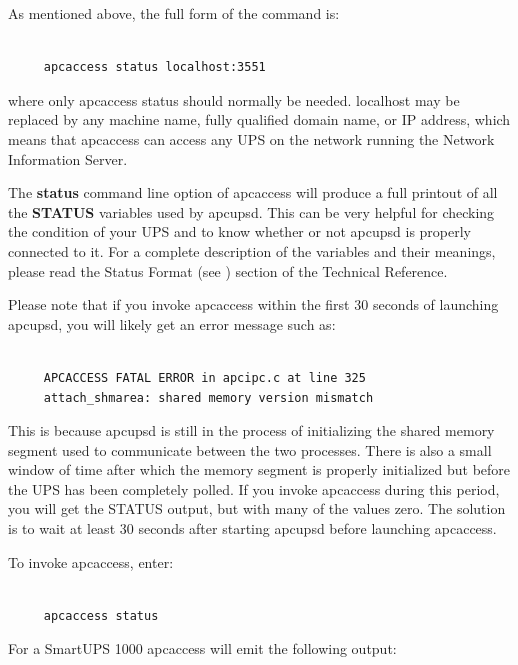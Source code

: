 {{{{\label{index-apcaccess-status-112}
\label{index-status_002c-apcaccess-113}
As mentioned above, the full form of the command is: 

\footnotesize
\begin{verbatim}
     
     apcaccess status localhost:3551
\end{verbatim}
\normalsize

where only apcaccess status should normally be needed. localhost may be
replaced by any machine name, fully qualified domain name, or IP address,
which means that apcaccess can access any UPS on the network running the
Network Information Server.  

The {\bf status} command line option of apcaccess will produce a full printout
of all the {\bf STATUS} variables used by apcupsd. This can be very helpful
for checking the condition of your UPS and to know whether or not apcupsd is
properly connected to it. For a complete description of the variables and
their meanings, please read the Status Format (see 
) section of
the Technical Reference.  

Please note that if you invoke apcaccess within the first 30 seconds of
launching apcupsd, you will likely get an error message such as: 

\footnotesize
\begin{verbatim}
     
     APCACCESS FATAL ERROR in apcipc.c at line 325
     attach_shmarea: shared memory version mismatch
\end{verbatim}
\normalsize

This is because apcupsd is still in the process of initializing the shared
memory segment used to communicate between the two processes. There is also a
small window of time after which the memory segment is properly initialized
but before the UPS has been completely polled. If you invoke apcaccess during
this period, you will get the STATUS output, but with many of the values zero.
The solution is to wait at least 30 seconds after starting apcupsd before
launching apcaccess.  

To invoke apcaccess, enter: 

\footnotesize
\begin{verbatim}
     
     apcaccess status
\end{verbatim}
\normalsize

For a SmartUPS 1000 apcaccess will emit the following output: 

}}}}
